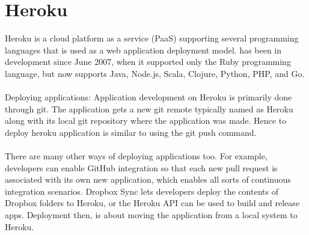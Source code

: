 \section{Heroku}
Heroku is a cloud platform as a service (PaaS) supporting several programming languages that is used as a web application deployment model.  has been in development since June 2007, when it supported only the Ruby programming language, but now supports Java, Node.js, Scala, Clojure, Python, PHP, and Go. \\ \\ Deploying applications: Application development on Heroku is primarily done through git. The application gets a new git remote typically named as Heroku along with its local git repository where the application was made. Hence to deploy heroku application is similar to using the git push command. \\ \\ There are many other ways of deploying applications too. For example, developers can enable GitHub integration so that each new pull request is associated with its own new application, which enables all sorts of continuous integration scenarios. Dropbox Sync lets developers deploy the contents of Dropbox folders to Heroku, or the Heroku API can be used to build and release apps. Deployment then, is about moving the application from a local system to Heroku.

